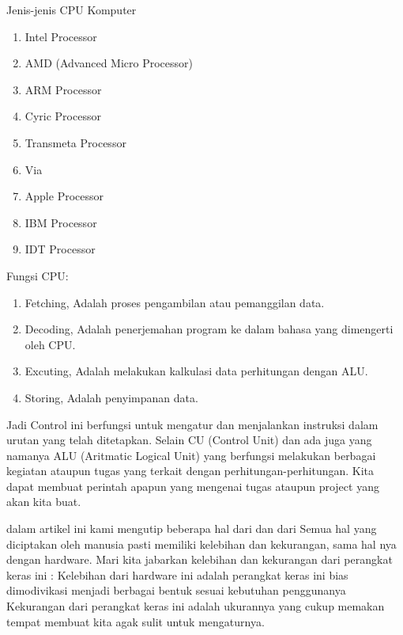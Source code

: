 Jenis-jenis CPU Komputer
\begin{enumerate}
\item Intel Processor
\item AMD (Advanced Micro Processor)
\item ARM Processor
\item Cyric Processor
\item Transmeta Processor
\item Via
\item Apple Processor
\item IBM Processor
\item IDT Processor
\end{enumerate}
Fungsi CPU:
\begin{enumerate}
\item Fetching, Adalah proses pengambilan atau pemanggilan data.
\item Decoding, Adalah penerjemahan program ke dalam bahasa yang dimengerti oleh CPU.
\item Excuting, Adalah melakukan kalkulasi data perhitungan dengan ALU.
\item Storing, Adalah penyimpanan data.
\end{enumerate}
Jadi Control ini berfungsi untuk mengatur dan menjalankan instruksi dalam urutan yang telah ditetapkan. Selain CU (Control Unit) dan ada juga yang namanya ALU (Aritmatic Logical Unit) yang berfungsi melakukan berbagai kegiatan ataupun tugas yang terkait dengan perhitungan-perhitungan.  Kita dapat membuat perintah apapun yang mengenai tugas ataupun project yang akan kita buat.

dalam artikel ini kami mengutip beberapa hal dari \cite{komputer2006sgs} dan dari \cite{tanenbaum2009modern}
Semua hal yang diciptakan oleh  manusia pasti memiliki kelebihan dan kekurangan, sama hal nya dengan hardware. Mari kita jabarkan kelebihan dan kekurangan dari perangkat keras ini :
Kelebihan dari hardware ini adalah perangkat keras ini bias dimodivikasi menjadi berbagai bentuk sesuai kebutuhan penggunanya
Kekurangan dari perangkat keras ini adalah ukurannya yang cukup memakan tempat membuat kita agak sulit untuk mengaturnya.

